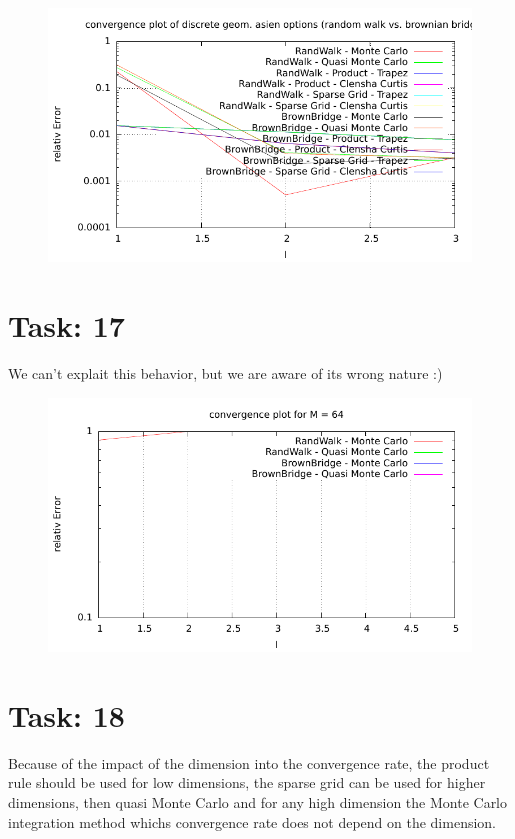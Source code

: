 \documentclass{article}
\begin{document}
\begin{figure}[htbp]
  \centering
     \includegraphics[width=1.0\textwidth]{../Task16/sh3_task16_convergence_plot.pdf}
\end{figure}

\section*{Task: 17}
We can't explait this behavior, but we are aware of its wrong nature :)
\begin{figure}[htbp]
  \centering
     \includegraphics[width=1.0\textwidth]{../Task17/sh3_task17_convergencePlot.pdf}
\end{figure}

\newpage

\section*{Task: 18}

Because of the impact of the dimension into the convergence rate, 
the product rule should be used for low dimensions, 
the sparse grid can be used for higher dimensions, then quasi Monte Carlo and
for any high dimension the Monte Carlo integration method whichs convergence rate does not depend on the dimension. 
\end{document}
